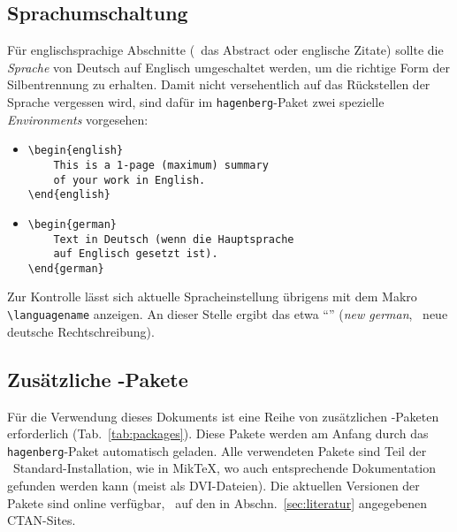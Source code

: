 \subsection{Sprachumschaltung}
\label{sec:sprachumschaltung}

Für englischsprachige Abschnitte (\zB\ das Abstract oder englische
Zitate) sollte die \emph{Sprache} von Deutsch auf Englisch
umgeschaltet werden, um die richtige Form der Silbentrennung zu
erhalten. Damit nicht versehentlich auf das Rückstellen der
Sprache vergessen wird, sind dafür im \texttt{hagenberg}-Paket zwei
spezielle \emph{Environments} vorgesehen:
%
\begin{itemize}
\item[] 
\verb!\begin{english}!\\
\verb!    This is a 1-page (maximum) summary!\\
\verb!    of your work in English.!\\
\verb!\end{english}!
\end{itemize}

\begin{itemize}
\item[] 
\verb!\begin{german}!\\
\verb!    Text in Deutsch (wenn die Hauptsprache!\\
\verb!    auf Englisch gesetzt ist).!\\
\verb!\end{german}!
\end{itemize}
%
Zur Kontrolle lässt sich aktuelle Spracheinstellung übrigens mit dem Makro \verb!\languagename!
anzeigen. An dieser Stelle ergibt das etwa "`\texttt{\languagename}"' (\emph{new german}, \dah\ neue deutsche Rechtschreibung).


\subsection{Zusätzliche {\latex}-Pakete}

Für die Verwendung dieses Dokuments ist eine Reihe von
zusätzlichen \latex-Paketen erforderlich
(Tab.~\ref{tab:packages}). Diese Pakete werden am Anfang
durch das \texttt{hagenberg}-Paket automatisch geladen. 
Alle verwendeten Pakete sind
Teil der \latex\ Standard-Installation, wie \zB in MikTeX, wo
auch entsprechende Dokumentation gefunden werden kann (meist als DVI-Dateien).
Die aktuellen Versionen der Pakete sind online verfügbar, \ua\ auf den
in Abschn.~\ref{sec:literatur} angegebenen CTAN-Sites.


